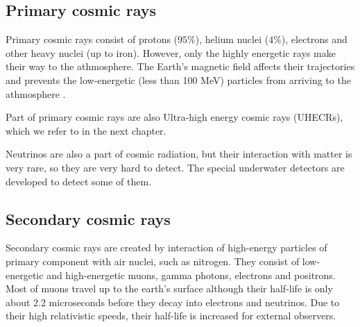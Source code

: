 \subsection{Primary cosmic rays}
Primary cosmic rays consist of protons ($95 \%$), helium nuclei ($4 \%$), electrons and other heavy nuclei (up to iron). However, only the highly energetic rays make their way to the athmosphere. The Earth's magnetic field affects their trajectories and prevents the low-energetic (less than 100 MeV) particles from arriving to the athmosphere \cite{Kliewer}. 
\par
Part of primary cosmic rays are also Ultra-high energy cosmic rays (UHECRs), which we refer to in the next chapter.
\par 
Neutrinos are also a part of cosmic radiation, but their interaction with matter is very rare, so they are very hard to detect. The special underwater detectors are developed to detect some of them. 
\subsection{Secondary cosmic rays}
Secondary cosmic rays are created by interaction of high-energy particles of primary component with air nuclei, such as nitrogen. They consist of low-energetic and high-energetic muons, gamma photons, electrons and positrons. Most of muons travel up to the earth's surface although their half-life is only about 2.2 microseconds before they decay into electrons and neutrinos. Due to their high relativistic speeds, their half-life is increased for external observers. 




